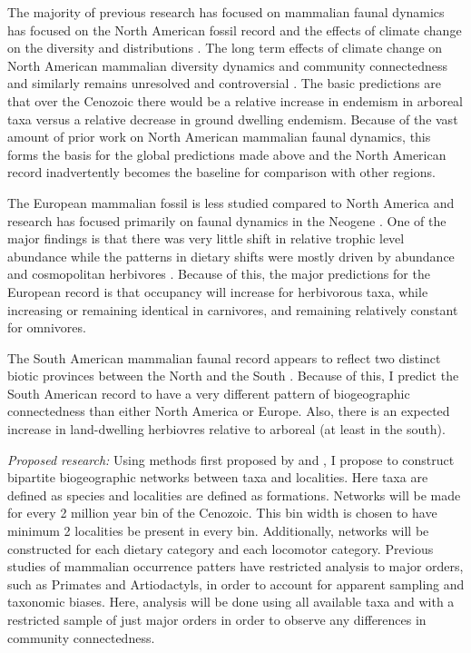 \documentclass[12pt,letterpaper]{article}
\begin{document}
The majority of previous research has focused on mammalian faunal dynamics has focused on the North American fossil record and the effects of climate change on the diversity and distributions \citep{Alroy2000g,Alroy1996a,Alroy1998,Barnosky2001a,Simpson1944,Simpson1953,Badgley2013,Blois2009,Figueirido2012,Gunnell1995,Hadly2001}. The long term effects of climate change on North American mammalian diversity dynamics and community connectedness and similarly remains unresolved and controversial \citep{Alroy2000g,Blois2009,Figueirido2012,Barnosky2001a}. The basic predictions are that over the Cenozoic there would be a relative increase in endemism in arboreal taxa versus a relative decrease in ground dwelling endemism. Because of the vast amount of prior work on North American mammalian faunal dynamics, this forms the basis for the global predictions made above and the North American record inadvertently becomes the baseline for comparison with other regions.

The European mammalian fossil is less studied compared to North America and research has focused primarily on faunal dynamics in the Neogene \citep{Jernvall2002,Jernvall2004,Liow2008,Raia2006,Raia2005,Raia2011c}. One of the major findings is that there was very little shift in relative trophic level abundance \citep{Jernvall2004} while the patterns in dietary shifts were mostly driven by abundance and cosmopolitan herbivores \citep{Jernvall2002}. Because of this, the major predictions for the European record is that occupancy will increase for herbivorous taxa, while increasing or remaining identical in carnivores, and remaining relatively constant for omnivores. 

The South American mammalian faunal record appears to reflect two distinct biotic provinces between the North and the South \citep{Macfadden1997,Macfadden2006,Flynn1998a,Patterson1968}. Because of this, I predict the South American record to have a very different pattern of biogeographic connectedness than either North America or Europe. Also, there is an expected increase in land-dwelling herbiovres relative to arboreal (at least in the south).


\textit{Proposed research:}
Using methods first proposed by \citet{Sidor2013} and \citet{Vilhena2013}, I propose to construct bipartite biogeographic networks between taxa and localities. Here taxa are defined as species and localities are defined as formations. Networks will be made for every 2 million year bin of the Cenozoic. This bin width is chosen to have minimum 2 localities be present in every bin. Additionally, networks will be constructed for each dietary category and each locomotor category. Previous studies of mammalian occurrence patters have restricted analysis to major orders, such as Primates and Artiodactyls, in order to account for apparent sampling and taxonomic biases. Here, analysis will be done using all available taxa and with a restricted sample of just major orders in order to observe any differences in community connectedness.
\end{document}
